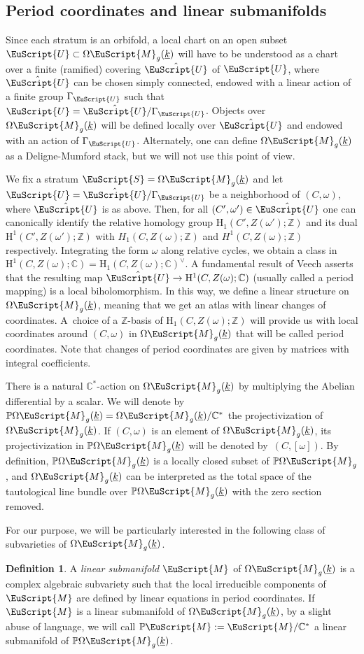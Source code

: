 \documentclass[JEP,XML,SOM,Unicode]{cedram}
\let\mathcal\EuScript
\theoremstyle{plain}
\theoremstyle{definition}
\newtheorem{Definition}[Theorem]{Definition}
\def\C{\mathbb{C}}
\newcommand\Z{\mathbb{Z}}
\newcommand{\Pb}{\mathbb{P}}
\newcommand{\Mcal}{\mathcal{M}}
\newcommand{\cM}{\mathcal{M}}
\newcommand{\cS}{\mathcal{S}}
\newcommand{\cU}{\mathcal{U}}
\let\omg\omega
\let\ul\underline
\newcommand{\HH}{\mathrm{H}}
\newcommand{\trate}{\Omega\Mcal_{g}(\ul{k})}
\begin{document}
\subsection{Period coordinates and linear submanifolds}\label{sec:local:coord}
Since each stratum is an orbifold, a local chart on an open subset $\cU\subset\trate$ will have to be understood as a chart over a finite (ramified) covering $\hat\cU$ of $\cU$, where $\hat\cU$ can be chosen simply connected, endowed with a linear action of a finite group $\Gamma_\cU$ such that $\cU=\hat\cU/\Gamma_\cU$. Objects over $\trate$ will be defined locally over $\hat\cU$ and endowed with an action of $\Gamma_\cU$. Alternately, one can define $\trate$ as a Deligne-Mumford stack, but we will not use this point of view.

We fix a stratum $\cS=\trate$ and let $\cU=\hat\cU/\Gamma_\cU$ be a neighborhood of $(C,\omega)$, where $\hat\cU$ is as above. Then, for all $(C',\omega')\in\hat\cU$ one can canonically identify the relative homology group $\HH_1(C', Z(\omega'); \Z)$ and its dual $\HH^1(C', Z(\omega'); \Z)$ with $H_1(C,Z(\omega);\Z)$ and $H^1(C,Z(\omega);\Z)$ respectively.
Integrating the form $\omega$ along relative cycles, we obtain a class in $\HH^1(C,Z(\omega); \C)=\HH_{1}(C,Z(\omega); \C)^\vee$. A fundamental result of Veech \cite{Veech90} asserts that the resulting map $\hat\cU\to \HH^1 (C, Z(\omega); \C)$
(usually called a period mapping) is a local biholomorphism. In this way, we define a linear structure on $\trate$, meaning that we get an atlas with linear changes of coordinates. A~choice of a $\Z$-basis of $\HH_1 (C, Z(\omega); \Z)$ will provide us with local coordinates around $(C, \omega)$ in $\trate$ that will be called period coordinates. Note that changes of period coordinates are given by matrices with integral coefficients.

There is a natural $\C^*$-action on $\trate$ by multiplying the Abelian differential by a scalar.
We will denote by $\Pb\trate=\trate/\C^*$ the projectivization of $\trate$.
If $(C,\omg)$ is an element of $\trate$, its projectivization in $\Pb\trate$ will be denoted by~$(C,[\omg])$.
By definition, $\Pb\trate$ is a locally closed subset of $\Pb\Omega\cM_g$, and $\trate$ can be interpreted as the total space of the tautological line bundle over $\Pb\trate$ with the zero section removed.

For our purpose, we will be particularly interested in the following class of subvarieties of $\trate$.

\begin{Definition}\label{def:lin:man}
A \emph{linear submanifold} $\cM$ of $\trate$ is a complex algebraic subvariety such that the local irreducible components of $\cM$ are defined by linear equations in period coordinates.
If $\cM$ is a linear submanifold of $\trate$, by a slight abuse of language, we will call $\Pb\cM:=\cM/\C^*$ a linear submanifold of $\Pb\trate$.
\end{Definition}
\end{document}
